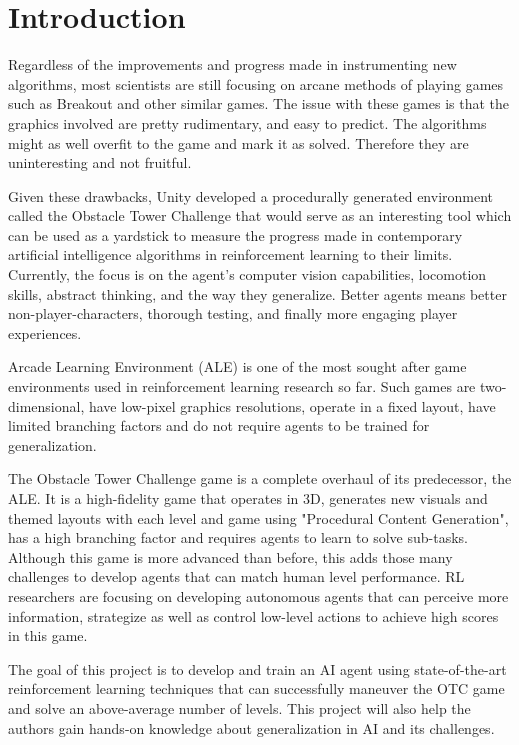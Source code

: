 \documentclass[conference]{IEEEtran}
\begin{document}
\section{Introduction}
Regardless of the improvements and progress made in instrumenting new algorithms, most scientists are still focusing on arcane methods of playing games such as Breakout and other similar games. The issue with these games is that the graphics involved are pretty rudimentary, and easy to predict. The algorithms might as well overfit to the game and mark it as solved. Therefore they are uninteresting and not fruitful.

Given these drawbacks, Unity developed a procedurally generated environment called the Obstacle Tower Challenge \cite{Juliani-et-al} that would serve as an interesting tool which can be used as a yardstick to measure the progress made in contemporary artificial intelligence algorithms in reinforcement learning to their limits. Currently, the focus is on the agent's computer vision capabilities, locomotion skills, abstract thinking, and the way they generalize. Better agents means better non-player-characters, thorough testing, and finally more engaging player experiences.

Arcade Learning Environment (ALE) is one of the most sought after game environments used in reinforcement learning research \cite{Bellemare-et-al}\cite{Mnih-2015} so far. Such games are two-dimensional, have low-pixel graphics resolutions, operate in a fixed layout, have limited branching factors and do not require agents to be trained for generalization.

The Obstacle Tower Challenge game is a complete overhaul of its predecessor, the ALE. It is a high-fidelity game that operates in 3D, generates new visuals and themed layouts with each level and game using "Procedural Content Generation", has a high branching factor and requires agents to learn to solve sub-tasks. Although this game is more advanced than before, this adds those many challenges to develop agents that can match human level performance. RL researchers are focusing on developing autonomous agents that can perceive more information, strategize as well as control low-level actions to achieve high scores in this game.

The goal of this project is to develop and train an AI agent using state-of-the-art reinforcement learning techniques that can successfully maneuver the OTC game and solve an above-average number of levels. This project will also help the authors gain hands-on knowledge about generalization in AI and its challenges.
\end{document}
